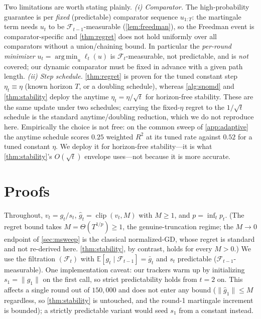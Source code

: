 \documentclass{article}
\newcommand{\E}{\mathbb{E}}
\newcommand{\norm}[1]{\lVert #1 \rVert}
\newcommand{\gt}{g_t}
\newcommand{\clip}{\operatorname{clip}}
\DeclareMathOperator*{\argmin}{arg\,min}
\begin{document}
\begin{remark}
\label{rmk:scope}
Two limitations are worth stating plainly. \emph{(i) Comparator.} The high-probability
guarantee is per \emph{fixed} (predictable) comparator sequence $u_{1:T}$: the martingale
term needs $u_t$ to be $\mathcal F_{t-1}$-measurable (\cref{lem:freedman}), so the Freedman
event is comparator-specific and \cref{thm:regret} does not hold uniformly over all
comparators without a union/chaining bound. In particular the \emph{per-round minimizer}
$u_t=\argmin_u\ell_t(u)$ is $\mathcal F_t$-measurable, not predictable, and is \emph{not}
covered; our dynamic comparator must be fixed in advance with a given path length. \emph{(ii)
Step schedule.} \cref{thm:regret} is proven for the tuned constant step $\eta_t\equiv\eta$
(known horizon $T$, or a doubling schedule), whereas \cref{alg:snomd} and \cref{thm:stability}
deploy the anytime $\eta_t=\eta/\sqrt t$ for horizon-free stability. These are the same update
under two schedules; carrying the fixed-$\eta$ regret to the $1/\sqrt t$ schedule is the
standard anytime/doubling reduction, which we do not reproduce here. Empirically the choice is
not free: on the common sweep of \cref{app:adaptive} the anytime schedule scores $0.25$ weighted
$R^2$ at its tuned rate against $0.52$ for a tuned constant $\eta$. We deploy it for horizon-free
stability---it is what \cref{thm:stability}'s $O(\sqrt t)$ envelope uses---not because it is more
accurate.
\end{remark}

\section{Proofs}
\label{app:proofs}

Throughout, $v_t=\gt/s_t$, $\hat g_t=\clip(v_t,M)$ with $M\ge1$, and $p=\inf_t p_t$. (The
regret bound takes $M=\Theta(T^{1/p})\ge1$, the genuine-truncation regime; the $M\!\to\!0$
endpoint of \cref{sec:msweep} is the classical normalized-GD, whose regret is standard and
not re-derived here. \cref{thm:stability}, by contrast, holds for every $M>0$.)
We use the filtration $(\mathcal F_t)$ with $\E[\gt\mid\mathcal F_{t-1}]=\bar g_t$ and
$s_t$ predictable ($\mathcal F_{t-1}$-measurable). One implementation caveat: our trackers
warm up by initializing $s_1=\norm{g_1}$ on the first call, so strict predictability holds
from $t=2$ on. This affects a single round out of $150{,}000$ and does not enter any bound
($\norm{\hat g_1}\le M$ regardless, so \cref{thm:stability} is untouched, and the round-1
martingale increment is bounded); a strictly predictable variant would seed $s_1$ from a
constant instead.
\end{document}
